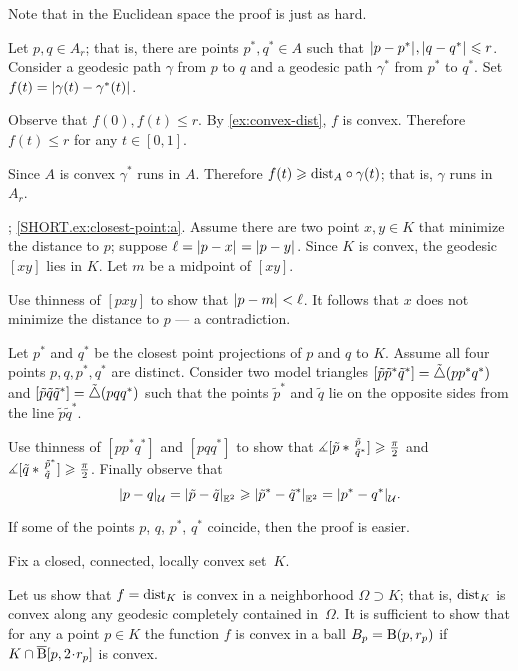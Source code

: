  Note that in the Euclidean space the proof is just as hard.

Let $p,q\in A_r$;
that is, there are points $p^*,q^*\in A$ such that $\dist{p}{p^*}{},\dist{q}{q^*}{}\le r$.
Consider a geodesic path $\gamma$ from $p$ to $q$ and a geodesic path $\gamma^*$ from $p^*$ to $q^*$.
Set $f(t)=\dist{\gamma(t)}{\gamma^*(t)}{}$.

Observe that $f(0),f(t)\le r$.
By \ref{ex:convex-dist}, $f$ is convex.
Therefore $f(t)\le r$ for any $t\in[0,1]$.

Since $A$ is convex $\gamma^*$ runs in $A$.
Therefore $f(t)\geqslant \mathrm{dist}_A\circ\gamma(t)$;
that is, $\gamma$  runs in $A_r$.

\parbf{\ref{ex:closest-point}}; \ref{SHORT.ex:closest-point:a}.
Assume there are two point $x,y\in K$ that minimize the distance to $p$;
suppose $\ell=\dist{p}{x}{}=\dist{p}{y}{}$.
Since $K$ is convex, the geodesic $[xy]$ lies in $K$.
Let $m$ be a midpoint of $[xy]$.

Use thinness of $[pxy]$ to show that $\dist{p}{m}{}<\ell$.
It follows that $x$ does not minimize the distance to $p$ --- a contradiction.

Let $p^*$ and $q^*$ be the closest point projections of $p$ and $q$ to $K$.
Assume all four points $p,q,p^*,q^*$ are distinct.
Consider two model triangles $[\tilde p\tilde p^*\tilde q^*]=\tilde\triangle(pp^*q^*)$ and $[\tilde p\tilde q\tilde q^*]=\tilde\triangle(pqq^*)$ 
such that the points $\tilde p^*$ and $\tilde q$ lie on the opposite sides from the line $\tilde p\tilde q^*$.

Use thinness of $[pp^*q^*]$ and $[pqq^*]$ to show that $\measuredangle[\tilde p*\,{}^{\tilde p}_{\tilde q^*}]\geqslant \tfrac\pi2$ and $\measuredangle[\tilde q*\,{}^{\tilde p^*}_{\tilde q}]\geqslant \tfrac\pi2$.
Finally observe that 
\[\dist{p}{q}{\spc{U}}=\dist{\tilde p}{\tilde q}{\EE^2}\ge \dist{\tilde p^*}{\tilde q^*}{\EE^2}=\dist{p^*}{q^*}{\spc{U}}.\]

If some of the points $p$, $q$, $p^*$, $q^*$ coincide, then the proof is easier.

 Fix a closed, connected, locally convex set~$K$.

Let us show that $f=\mathrm{dist}_K$ is convex in a neighborhood $\Omega\supset K$; that is, $\mathrm{dist}_K$ is convex along any geodesic completely contained in~$\Omega$.
It is sufficient to show that for any a point $p\in K$ the function $f$ is convex in a ball $B_p= \mathrm{B}{}(p, r_p)$ if $K\cap \cBall[p,2\cdot r_p]$ is convex.

